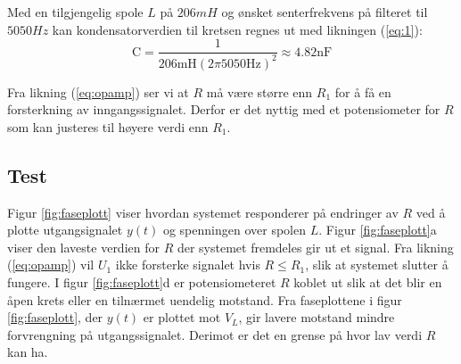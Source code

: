 \documentclass[a4paper,11pt,norsk]{article}
\begin{document}
Med en tilgjengelig spole $L$ på $206mH$ og ønsket senterfrekvens på filteret til $5050Hz$ kan kondensatorverdien til kretsen regnes ut med likningen (\ref{eq:1}):
\begin{equation}
    \text{C} = \frac{1}{206\text{mH}(2\pi 5050\text{Hz})^2} \approx 4.82 \text{nF}
\end{equation}

Fra likning (\ref{eq:opamp}) ser vi at $R$ må være større enn $R_1$ for å få en forsterkning av inngangssignalet. Derfor er det nyttig med et potensiometer for $R$ som kan justeres til høyere verdi enn $R_1$. 

\subsection{Test}

Figur \ref{fig:faseplott} viser hvordan systemet responderer på endringer av $R$ ved å plotte utgangsignalet $y(t)$ og spenningen over spolen $L$. Figur \ref{fig:faseplott}a viser den laveste verdien for $R$ der systemet fremdeles gir ut et signal. Fra likning (\ref{eq:opamp}) vil $U_1$ ikke forsterke signalet hvis $R \le R_1$, slik at systemet slutter å fungere.
I figur \ref{fig:faseplott}d er potensiometeret $R$ koblet ut slik at det blir en åpen krets eller en tilnærmet uendelig motstand.  
Fra faseplottene i figur \ref{fig:faseplott}, der $y(t)$ er plottet mot $V_L$, gir lavere motstand mindre forvrengning på utgangssignalet. Derimot er det en grense på hvor lav verdi $R$ kan ha. 
\end{document}
